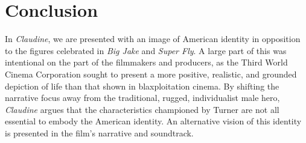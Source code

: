 










\section{Conclusion}

In \textit{Claudine}, we are presented with an image of American identity in opposition to the figures celebrated in \textit{Big Jake} and \textit{Super Fly}.
A large part of this was intentional on the part of the filmmakers and producers, as the Third World Cinema Corporation sought to present a more positive, realistic, and grounded depiction of life than that shown in blaxploitation cinema.
By shifting the narrative focus away from the traditional, rugged, individualist male hero, \textit{Claudine} argues that the characteristics championed by Turner are not all essential to embody the American identity.
An alternative vision of this identity is presented in the film's narrative and soundtrack.

